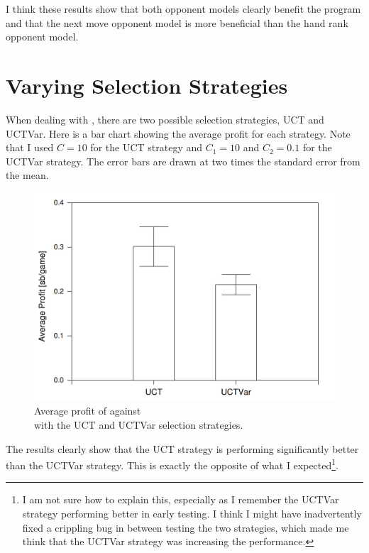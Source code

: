 I think these results show that both opponent models clearly benefit the program and that the next move opponent model is more beneficial than the hand rank opponent model.





\section{Varying Selection Strategies}			%

When dealing with \choices, there are two possible selection strategies, UCT and UCTVar. 
Here is a bar chart showing the average profit for each strategy. Note that I used \(C = 10\) for the UCT strategy and \(C_1 = 10\) and \(C_2 = 0.1\) for the UCTVar strategy. The error bars are drawn at two times the standard error from the mean.
\begin{figure}[H]
\centering
\includegraphics[width=144mm]{Graphs/SBvMB-UCT.png}
\caption{Average profit of \mbt against \sbt \\ with the UCT and UCTVar selection strategies.}
\end{figure}

The results clearly show that the UCT strategy is performing significantly better than the UCTVar strategy. This is exactly the opposite of what I expected\footnote{I am not sure how to explain this, especially as I remember the UCTVar strategy performing better in early testing. I think I might have inadvertently fixed a crippling bug in between testing the two strategies, which made me think that the UCTVar strategy was increasing the performance.}.

